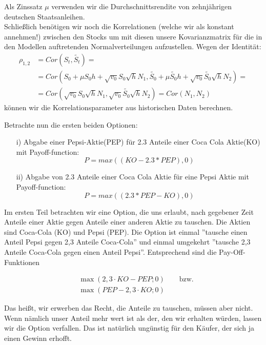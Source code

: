 \documentclass[12pt]{article}
\begin{document}
Als Zinssatz $\mu$ verwenden wir die Durchschnittsrendite von zehnjährigen deutschen Staatsanleihen.\\
Schließlich benötigen wir noch die Korrelationen (welche wir als konstant annehmen!) zwischen den Stocks um mit diesen unsere Kovarianzmatrix für die in den Modellen auftretenden Normalverteilungen aufzustellen.
Wegen der Identität:
\begin{align*}
\rho_{1,2}&=Cor(S_t,\tilde{S_t})=\\
&=Cor(S_0+\mu S_0h+\sqrt{v_0}S_0\sqrt{h}N_1,\tilde{S_0}+\mu \tilde{S_0}h+\sqrt{v_0}\tilde{S_0}\sqrt{h}N_2)= \\
&=Cor(\sqrt{v_0}S_0\sqrt{h}N_1,\sqrt{v_0}\tilde{S_0}\sqrt{h}N_2)=Cor(N_1,N_2)
\end{align*}
können wir die Korrelationsparameter aus historischen Daten berechnen.


Betrachte nun die ersten beiden Optionen:
\begin{itemize}
	\item[i)] Abgabe einer Pepsi-Aktie(PEP) für 2.3 Anteile einer Coca Cola Aktie(KO) mit Payoff-function:
	\begin{equation*}
	P=max((KO-2.3*PEP),0)
	\end{equation*}			
	\item[ii)] Abgabe von 2.3 Anteile einer Coca Cola Aktie für eine Pepsi Aktie mit Payoff-function:
	\begin{equation*}
	P=max((2.3*PEP-KO),0)
	\end{equation*}			
\end{itemize}


Im ersten Teil betrachten wir eine Option, die uns erlaubt, nach gegebener Zeit Anteile einer Aktie gegen Anteile einer anderen Aktie zu tauschen. Die Aktien sind Coca-Cola (KO) und Pepsi (PEP). Die Option ist einmal ''tausche einen Anteil Pepsi gegen 2,3 Anteile Coca-Cola'' und einmal umgekehrt ''tausche 2,3 Anteile Coca-Cola gegen einen Anteil Pepsi''. Entsprechend sind die Pay-Off-Funktionen

\begin{align*}
&\max(2,3\cdot KO - PEP; 0) \qquad \text{bzw.} \\
&\max(PEP - 2,3\cdot KO; 0)
\end{align*}

Das heißt, wir erwerben das Recht, die Anteile zu tauschen, müssen aber nicht. Wenn nämlich unser Anteil mehr wert ist als der, den wir erhalten würden, lassen wir die Option verfallen. Das ist natürlich ungünstig für den Käufer, der sich ja einen Gewinn erhofft.
\end{document}
